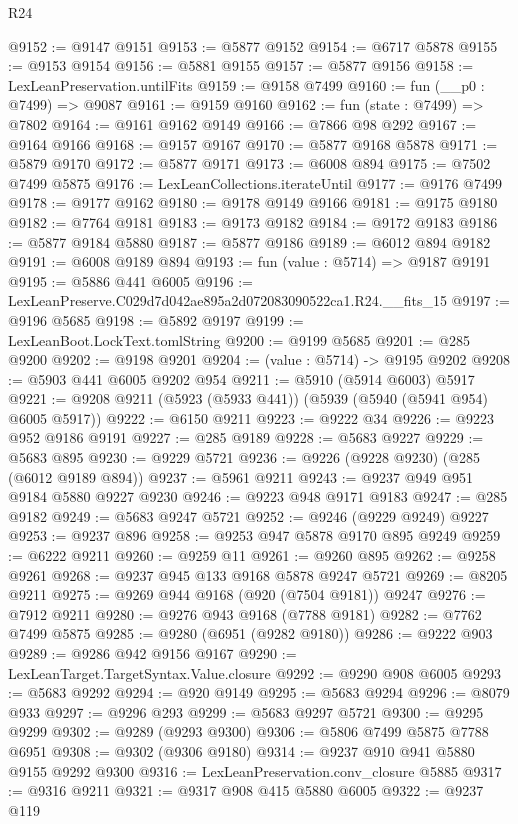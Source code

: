 \begin{lexlean}{R24}
\begin{coremodule}
@9152 := @9147 @9151
@9153 := @5877 @9152
@9154 := @6717 @5878
@9155 := @9153 @9154
@9156 := @5881 @9155
@9157 := @5877 @9156
@9158 := LexLeanPreservation.untilFits
@9159 := @9158 @7499
@9160 := fun (__p0 : @7499) => @9087
@9161 := @9159 @9160
@9162 := fun (state : @7499) => @7802
@9164 := @9161 @9162 @9149
@9166 := @7866 @98 @292
@9167 := @9164 @9166
@9168 := @9157 @9167
@9170 := @5877 @9168 @5878
@9171 := @5879 @9170
@9172 := @5877 @9171
@9173 := @6008 @894
@9175 := @7502 @7499 @5875
@9176 := LexLeanCollections.iterateUntil
@9177 := @9176 @7499
@9178 := @9177 @9162
@9180 := @9178 @9149 @9166
@9181 := @9175 @9180
@9182 := @7764 @9181
@9183 := @9173 @9182
@9184 := @9172 @9183
@9186 := @5877 @9184 @5880
@9187 := @5877 @9186
@9189 := @6012 @894 @9182
@9191 := @6008 @9189 @894
@9193 := fun (value : @5714) => @9187 @9191
@9195 := @5886 @441 @6005
@9196 := LexLeanPreserve.C029d7d042ae895a2d072083090522ca1.R24.__fits_15
@9197 := @9196 @5685
@9198 := @5892 @9197
@9199 := LexLeanBoot.LockText.tomlString
@9200 := @9199 @5685
@9201 := @285 @9200
@9202 := @9198 @9201
@9204 := (value : @5714) -> @9195 @9202
@9208 := @5903 @441 @6005 @9202 @954
@9211 := @5910 (@5914 @6003) @5917
@9221 := @9208 @9211 (@5923 (@5933 @441)) (@5939 (@5940 (@5941 @954) @6005 @5917))
@9222 := @6150 @9211
@9223 := @9222 @34
@9226 := @9223 @952 @9186 @9191
@9227 := @285 @9189
@9228 := @5683 @9227
@9229 := @5683 @895
@9230 := @9229 @5721
@9236 := @9226 (@9228 @9230) (@285 (@6012 @9189 @894))
@9237 := @5961 @9211
@9243 := @9237 @949 @951 @9184 @5880 @9227 @9230
@9246 := @9223 @948 @9171 @9183
@9247 := @285 @9182
@9249 := @5683 @9247 @5721
@9252 := @9246 (@9229 @9249) @9227
@9253 := @9237 @896
@9258 := @9253 @947 @5878 @9170 @895 @9249
@9259 := @6222 @9211
@9260 := @9259 @11
@9261 := @9260 @895
@9262 := @9258 @9261
@9268 := @9237 @945 @133 @9168 @5878 @9247 @5721
@9269 := @8205 @9211
@9275 := @9269 @944 @9168 (@920 (@7504 @9181)) @9247
@9276 := @7912 @9211
@9280 := @9276 @943 @9168 (@7788 @9181)
@9282 := @7762 @7499 @5875
@9285 := @9280 (@6951 (@9282 @9180))
@9286 := @9222 @903
@9289 := @9286 @942 @9156 @9167
@9290 := LexLeanTarget.TargetSyntax.Value.closure
@9292 := @9290 @908 @6005
@9293 := @5683 @9292
@9294 := @920 @9149
@9295 := @5683 @9294
@9296 := @8079 @933
@9297 := @9296 @293
@9299 := @5683 @9297 @5721
@9300 := @9295 @9299
@9302 := @9289 (@9293 @9300)
@9306 := @5806 @7499 @5875 @7788 @6951
@9308 := @9302 (@9306 @9180)
@9314 := @9237 @910 @941 @5880 @9155 @9292 @9300
@9316 := LexLeanPreservation.conv_closure @5885
@9317 := @9316 @9211
@9321 := @9317 @908 @415 @5880 @6005
@9322 := @9237 @119

\end{coremodule}
\end{lexlean}
